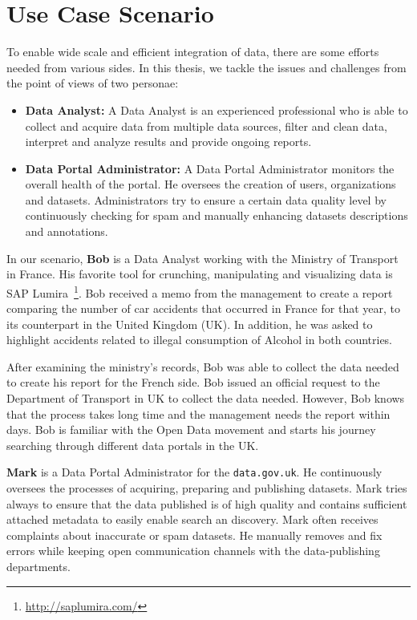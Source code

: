 \section{Use Case Scenario}

To enable wide scale and efficient integration of data, there are some efforts needed from various sides. In this thesis, we tackle the issues and challenges from the point of views of two personae:

\begin{itemize}
\item \textbf{Data Analyst:} A Data Analyst is an experienced professional who is able to collect and acquire data from multiple data sources, filter and clean data, interpret and analyze results and provide ongoing reports.
\item \textbf{Data Portal Administrator:} A Data Portal Administrator monitors the overall health of the portal. He oversees the creation of users, organizations and datasets. Administrators try to ensure a certain data quality level by continuously checking for spam and manually enhancing datasets descriptions and annotations.
\end{itemize}

In our scenario, \textbf{Bob} is a Data Analyst working with the Ministry of Transport in France. His favorite tool for crunching, manipulating and visualizing data is SAP Lumira~\footnote{\url{http://saplumira.com/}}. Bob received a memo from the management to create a report comparing the number of car accidents that occurred in France for that year, to its counterpart in the United Kingdom (UK). In addition, he was asked to highlight accidents related to illegal consumption of Alcohol in both countries.

After examining the ministry's records, Bob was able to collect the data needed to create his report for the French side. Bob issued an official request to the Department of Transport in UK  to collect the data needed. However, Bob knows that the process takes long time and the management needs the report within days. Bob is familiar with the Open Data movement and starts his journey searching through different data portals in the UK.

\textbf{Mark} is a Data Portal Administrator for the \texttt{data.gov.uk}. He continuously oversees the processes of acquiring, preparing and publishing datasets. Mark tries always to ensure that the data published is of high quality and contains sufficient attached metadata to easily enable search an discovery. Mark often receives complaints about inaccurate or spam datasets. He manually removes and fix errors while keeping open communication channels with the data-publishing departments.

